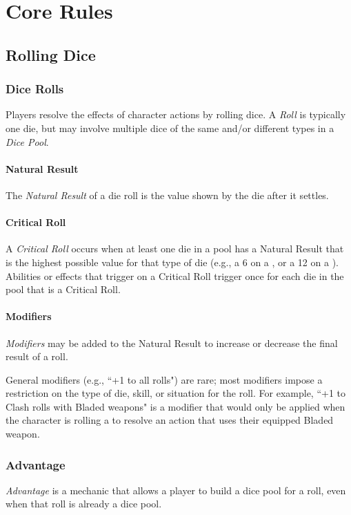 
\part{Core Rules}

\chapter{Rolling Dice}


\section{Dice Rolls}
Players resolve the effects of character actions by rolling dice.
A \textit{Roll} is typically one die, but may involve multiple dice of the 
same and/or different types in a \textit{Dice Pool}.


\subsection{Natural Result}
The \textit{Natural Result} of a die roll is the value shown by the die 
after it settles.


\subsection{Critical Roll}
A \textit{Critical Roll} occurs when at least one die in a pool has a 
Natural Result that is the highest possible value for that type of die 
(e.g., a 6 on a , or a 12 on a ).
Abilities or effects that trigger on a Critical Roll trigger once 
for each die in the pool that is a Critical Roll.


\subsection{Modifiers}
\textit{Modifiers} may be added to the Natural Result 
to increase or decrease the final result of a roll.

\begin{DesignerNote}
  General modifiers (e.g., ``+1 to all rolls") are rare; 
  most modifiers impose a restriction on the type of die, 
  skill, or situation for the roll.
  For example, ``+1 to Clash rolls with Bladed weapons" is a modifier 
  that would only be applied when the character is rolling a  
  to resolve an action that uses their equipped Bladed weapon.
\end{DesignerNote}


\section{Advantage}
\textit{Advantage} is a mechanic that allows a player to build a dice pool 
for a roll, even when that roll is already a dice pool.

